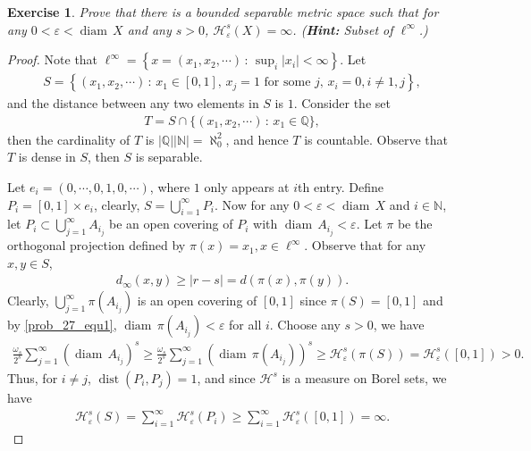 \documentclass[11pt]{book}
\newtheorem{exercise}{Exercise}[section]
\theoremstyle{definition}
\numberwithin{equation}{chapter}
\def\H{{\mathcal H}}
\def\diam{{\operatorname{diam}\,}}
\begin{document}
\medskip

\begin{exercise}
Prove that there is a bounded separable metric space such that for any $0<\varepsilon<\diam X$ and any $s>0$, $\H^s_\varepsilon(X)=\infty$. ({\bf Hint:} Subset of $\ell^\infty$.)
\end{exercise}
\begin{proof}
Note that $\ell^\infty = \left\{x = (x_1,x_2,\cdots) \,:\, \sup_i \left|x_i\right| < \infty \right\}$. Let
\begin{align*}
    S = \left\{(x_1, x_2, \cdots) \,:\, x_1 \in [0,1],\, x_j = 1\,\, \text{for some $j$},\, x_i = 0, i \neq 1,j \right\},
\end{align*}
and the distance between any two elements in $S$ is $1$. Consider the set 
\begin{align*}
    T = S \cap \{(x_1, x_2, \cdots) \,:\, x_1 \in \mathbb{Q} \},
\end{align*}
then the cardinality of $T$ is $|\mathbb{Q}| |\mathbb{N}| = \aleph_0^2$, and hence $T$ is countable. Observe that $T$ is dense in $S$, then $S$ is separable. 

Let $e_i = (0,\cdots,0,1,0,\cdots)$, where $1$ only appears at $i$th entry. Define $P_i = [0,1] \times e_i$, clearly, $S = \bigcup^\infty_{i=1} P_i$. Now for any $0 < \varepsilon < \diam X$ and $i \in \mathbb{N}$, let $P_i \subset \bigcup^\infty_{j=1} A_{i_j}$ be an open covering of $P_i$ with $\diam A_{i_j} < \varepsilon$. Let $\pi$ be the orthogonal projection defined by $\pi(x) = x_1, x \in \ell^\infty$. Observe that for any $x, y \in S$,
\begin{align}\label{prob_27_equ1}
    d_\infty(x,y) \geq \left|r - s\right| = d(\pi(x),\pi(y)).
\end{align}
Clearly, $\bigcup^\infty_{j=1} \pi(A_{i_j})$ is an open covering of $[0,1]$ since $\pi(S) = [0,1]$ and by \eqref{prob_27_equ1}, $\diam \pi(A_{i_j}) < \varepsilon$ for all $i$. Choose any $s > 0$, we have
\begin{align*}
    \frac{\omega_s}{2^s} \sum^\infty_{j=1} (\diam A_{i_j})^s \geq \frac{\omega_s}{2^s} \sum^\infty_{j=1} (\diam \pi(A_{i_j}))^s \geq \mathcal{H}^s_{\varepsilon}(\pi(S)) = \mathcal{H}^s_{\varepsilon}([0,1]) > 0.
\end{align*}
Thus, for $i \neq j$, $\operatorname{dist}(P_i,P_j) = 1$, and since $\mathcal{H}^s$ is a measure on Borel sets, we have
\begin{align*}
    \mathcal{H}^s_\varepsilon(S) = \sum^\infty_{i=1} \mathcal{H}^s_\varepsilon(P_i) \geq \sum^\infty_{i=1} \mathcal{H}^s_{\varepsilon}([0,1]) = \infty.
\end{align*}
\end{proof}
\end{document}
